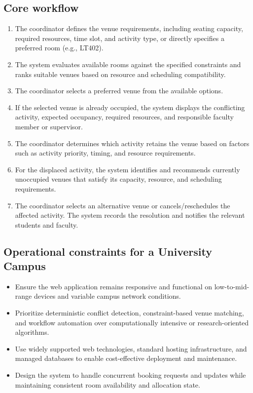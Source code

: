 \documentclass[11pt,a4paper]{article}
\begin{document}
\subsection{Core workflow}
\begin{enumerate}[leftmargin=0.7cm]
    \item The coordinator defines the venue requirements, including seating capacity, required resources, time slot, and activity type, or directly specifies a preferred room (e.g., LT402).
    \item The system evaluates available rooms against the specified constraints and ranks suitable venues based on resource and scheduling compatibility.
    \item The coordinator selects a preferred venue from the available options.
    \item If the selected venue is already occupied, the system displays the conflicting activity, expected occupancy, required resources, and responsible faculty member or supervisor.
    \item The coordinator determines which activity retains the venue based on factors such as activity priority, timing, and resource requirements.
    \item For the displaced activity, the system identifies and recommends currently unoccupied venues that satisfy its capacity, resource, and scheduling requirements.
    \item The coordinator selects an alternative venue or cancels/reschedules the affected activity. The system records the resolution and notifies the relevant students and faculty.
\end{enumerate}



\subsection{Operational constraints for a University Campus}
\begin{itemize}[leftmargin=0.7cm]
    \item Ensure the web application remains responsive and functional on low-to-mid-range devices and variable campus network conditions.
    \item Prioritize deterministic conflict detection, constraint-based venue matching, and workflow automation over computationally intensive or research-oriented algorithms.
    \item Use widely supported web technologies, standard hosting infrastructure, and managed databases to enable cost-effective deployment and maintenance.
    \item Design the system to handle concurrent booking requests and updates while maintaining consistent room availability and allocation state.
\end{itemize}
\end{document}

